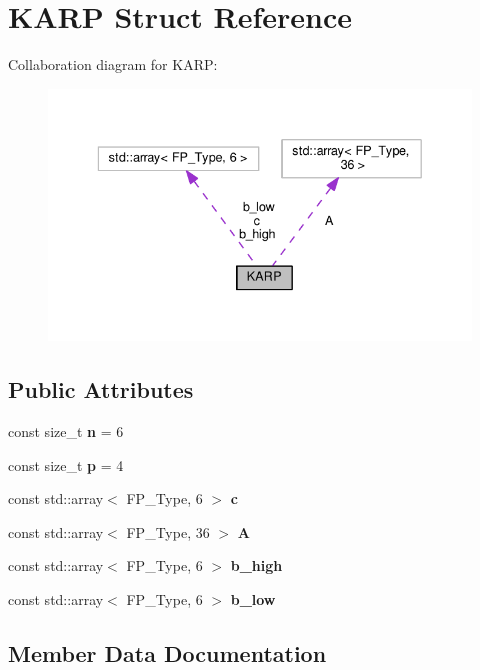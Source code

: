 \hypertarget{structKARP}{}\section{K\+A\+RP Struct Reference}
\label{structKARP}


Collaboration diagram for K\+A\+RP\+:\nopagebreak
\begin{figure}[H]
\begin{center}
\leavevmode
\includegraphics[width=336pt]{structKARP__coll__graph}
\end{center}
\end{figure}
\subsection*{Public Attributes}
\begin{DoxyCompactItemize}
\item 
\mbox{\label{structKARP_ae4748bfe9d63b1aaa28a8ea47072f8e3}} 
const size\+\_\+t {\bfseries n} = 6
\item 
\mbox{\label{structKARP_a68a9bee99c22bab5ba56a392e2fa6cb0}} 
const size\+\_\+t {\bfseries p} = 4
\item 
const std\+::array$<$ F\+P\+\_\+\+Type, 6 $>$ {\bfseries c}
\item 
const std\+::array$<$ F\+P\+\_\+\+Type, 36 $>$ {\bfseries A}
\item 
const std\+::array$<$ F\+P\+\_\+\+Type, 6 $>$ {\bfseries b\+\_\+high}
\item 
const std\+::array$<$ F\+P\+\_\+\+Type, 6 $>$ {\bfseries b\+\_\+low}
\end{DoxyCompactItemize}


\subsection{Member Data Documentation}
\mbox{\label{structKARP_a5e62cee865e772c7a7e7072f578c658d}} 
